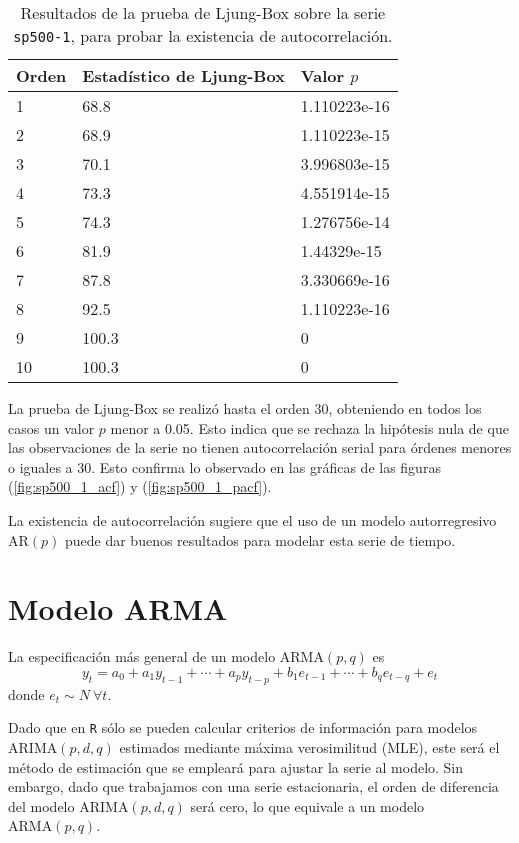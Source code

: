 \documentclass{article}
\begin{document}
\begin{table}[H]
\centering
\begin{tabularx}{0.9\textwidth}{YYY}
\toprule
Orden & Estadístico de Ljung-Box & Valor $p$ \\
 & 68.8 & 1.110223e-16 \\
2 & 68.9 & 1.110223e-15 \\
3 & 70.1 & 3.996803e-15 \\
4 & 73.3 & 4.551914e-15 \\
5 & 74.3 & 1.276756e-14 \\
6 & 81.9 & 1.44329e-15 \\
7 & 87.8 & 3.330669e-16 \\
8 & 92.5 & 1.110223e-16 \\
9 & 100.3 & 0 \\
10 & 100.3 & 0 \\
\bottomrule
\end{tabularx}
\caption{\label{tab:ljungbox}Resultados de la prueba de Ljung-Box sobre la serie \texttt{sp500-1}, para probar la existencia de autocorrelación.}
\end{table}

La prueba de Ljung-Box se realizó hasta el orden 30, obteniendo en todos los casos un valor $p$ menor a 0.05. Esto indica que se rechaza la hipótesis nula de que las observaciones de la serie no tienen autocorrelación serial para órdenes menores o iguales a 30. Esto confirma lo observado en las gráficas de las figuras (\ref{fig:sp500_1_acf}) y (\ref{fig:sp500_1_pacf}).

La existencia de autocorrelación sugiere que el uso de un modelo autorregresivo $\mathrm{AR}(p)$ puede dar buenos resultados para modelar esta serie de tiempo.


\newpage
\section{Modelo ARMA}

La especificación más general de un modelo $\mathrm{ARMA}(p, q)$ es
\[ y_t = a_0 + a_1 y_{t-1} + \cdots + a_p y_{t-p} + b_1 e_{t-1} + \cdots + b_q e_{t-q} + e_t \]
donde $e_{t} \sim N \ \forall t$.

Dado que en \texttt{R} sólo se pueden calcular criterios de información para modelos $\mathrm{ARIMA}(p, d, q)$ estimados mediante máxima verosimilitud (MLE), este será el método de estimación que se empleará para ajustar la serie al modelo. Sin embargo, dado que trabajamos con una serie estacionaria, el orden de diferencia del modelo $\mathrm{ARIMA}(p, d, q)$ será cero, lo que equivale a un modelo $\mathrm{ARMA}(p, q)$.
\end{document}

